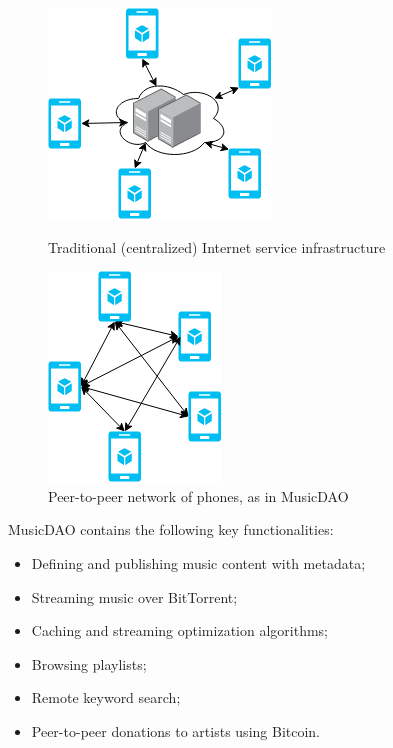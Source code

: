 \begin{figure}
        \centering
        \includegraphics[width=0.6\linewidth]{design/centralized-service.png}
        \caption{Traditional (centralized) Internet service infrastructure}
        \label{fig:centralized-service-intro}
    \endminipage\hfill
        \centering
        \includegraphics[width=0.6\linewidth]{design/decentralized-phones.png}
        \caption{Peer-to-peer network of phones, as in MusicDAO}
        \label{fig:decentralized-phones-intro}
    \endminipage
\end{figure}

MusicDAO contains the following key functionalities:
\begin{itemize}
    \item Defining and publishing music content with metadata;
    \item Streaming music over BitTorrent;
    \item Caching and streaming optimization algorithms;
    \item Browsing playlists;
    \item Remote keyword search;
    \item Peer-to-peer donations to artists using Bitcoin.
\end{itemize}

